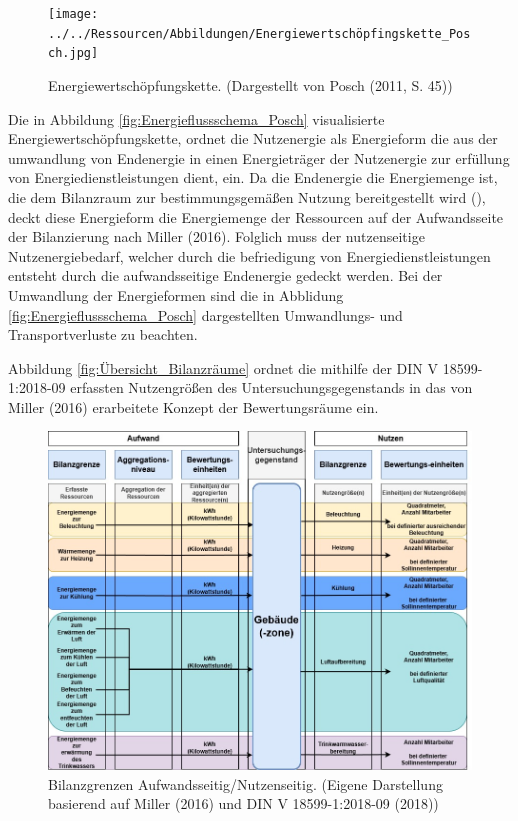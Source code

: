 \begin{figure}[H]
    \centering
    \texttt{[image: ../../Ressourcen/Abbildungen/Energiewertschöpfingskette\_Posch.jpg]}
    \caption{Energiewertschöpfungskette. (Dargestellt von Posch (2011, S. 45))}
    \label{fig:Energieflussschema_Posch}
\end{figure}

Die in Abbildung \eqref{fig:Energieflussschema_Posch} visualisierte Energiewertschöpfungskette, ordnet die Nutzenergie als Energieform die aus der umwandlung von Endenergie 
in einen Energieträger der Nutzenergie zur erfüllung von Energiedienstleistungen dient, ein.
Da die Endenergie die Energiemenge ist, die dem Bilanzraum zur bestimmungsgemäßen Nutzung bereitgestellt wird (\cite[Kapitel 3.1.2]{DIN18599.2018}), 
deckt diese Energieform die Energiemenge der Ressourcen auf der Aufwandsseite der Bilanzierung nach Miller (2016).
Folglich muss der nutzenseitige Nutzenergiebedarf, welcher durch die befriedigung von Energiedienstleistungen entsteht durch die aufwandsseitige Endenergie gedeckt werden.
Bei der Umwandlung der Energieformen sind die in Abblidung \eqref{fig:Energieflussschema_Posch} dargestellten Umwandlungs- und Transportverluste zu beachten.


Abbildung \eqref{fig:Übersicht_Bilanzräume} ordnet die mithilfe der DIN V 18599-1:2018-09 erfassten Nutzengrößen des Untersuchungsgegenstands in das von 
Miller (2016) erarbeitete Konzept der Bewertungsräume ein.

\begin{figure}[H]
    \centering
    \includegraphics[width=1\textwidth]{../../Ressourcen/Abbildungen/Nutzengröße_Bewertungseinheit.jpg}
    \caption{Bilanzgrenzen Aufwandsseitig/Nutzenseitig. (Eigene Darstellung basierend auf Miller (2016) und DIN V 18599-1:2018-09 (2018))}
    \label{fig:Übersicht_Bilanzräume}
\end{figure}

